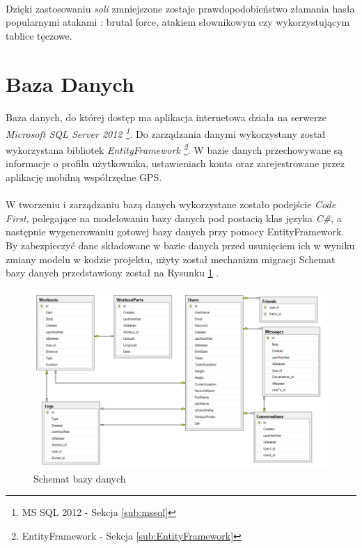 \paragraph{} %
\label{par:}
Dzięki zastosowaniu \textit{soli} zmniejszone zostaje prawdopodobieństwo złamania hasła popularnymi atakami : brutal force, atakiem słownikowym czy wykorzystującym tablice tęczowe.


\section{Baza Danych} %
\label{sec:baza_danych}
\paragraph{} %
\label{par:}
Baza danych, do której dostęp ma aplikacja internetowa działa na serwerze \textit{Microsoft SQL Server 2012 \footnote{MS SQL 2012 - Sekcja \ref{sub:mssql}}}. Do zarządzania danymi wykorzystany został wykorzystana bibliotek \textit{EntityFramework \footnote{EntityFramework - Sekcja \ref{sub:EntityFramework}}}. W bazie danych przechowywane są informacje o profilu użytkownika, ustawieniach konta oraz zarejestrowane przez aplikację mobilną współrzędne GPS.

\paragraph{} %
\label{par:}
W tworzeniu i zarządzaniu bazą danych wykorzystane zostało podejście \textit{Code First}, polegające na modelowaniu bazy danych pod postacią klas języka \textit{C\#}, a następnie wygenerowaniu gotowej bazy danych przy pomocy EntityFramework. By zabezpieczyć dane składowane w bazie danych przed usunięciem ich w wyniku zmiany modelu w kodzie projektu, użyty został mechanizm migracji 
Schemat bazy danych przedstawiony został na Rysunku \ref{fig:database} .


\label{sub:schemat_bazy_danych}
\begin{figure}[ht]
	\centering
		\includegraphics[width=1\linewidth]{assets/database.png}
	\caption{Schemat bazy danych}
	\label{fig:database}
\end{figure}

